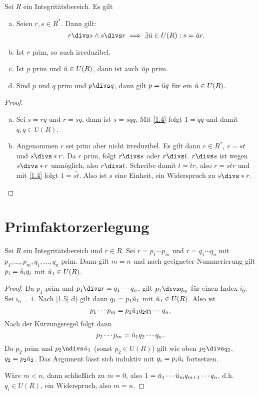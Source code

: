 \begin{lem} \label{1.5}
	Sei $R$ ein Integritätsbereich. Es gilt
	\begin{enumerate}[a)]
		\item
			Seien $r, s \in R^*$.
			Dann gilt:
			\[
				r\divs s  \land  s\divs r
				\implies
				\exists \unit u \in U(R) : s = \unit u r.
			\]
		\item
			Ist $r$ prim, so auch irreduzibel.
		\item
			Ist $p$ prim und $\breve{u} \in U(R)$, dann ist auch $\breve{u} p$ prim.
		\item
			Sind $p$ und $q$ prim und $p \divs  q$, dann gilt $p = \breve{u} q$ für ein $\breve{u} \in U(R)$.
	\end{enumerate}
	\begin{proof}
		\begin{enumerate}[a)]
			\item
				Sei $s = rq$ und $r = s\tilde q$, dann ist $s = s \tilde q q$.
				Mit \ref{1.4} folgt $1 = \tilde q q$ und damit $\tilde q, q \in U(R)$.
			\item
				Angenommen $r$ sei prim aber nicht irreduzibel.
				Es gilt dann $r \in R^*$, $r = st$ und $s \divs*  r$.
				Da $r$ prim, folgt $r \divs  s$ oder $r \divs  t$.
				$r \divs  s$ ist wegen $s \divs*  r$ unmöglich, also $r \divs  t$.
				Schreibe damit $t = \tilde t r$, also $r = s \tilde t r$ und mit \ref{1.4} folgt $1 = s \tilde t$.
				Also ist $s$ eine Einheit, ein Widerspruch zu $s \divs* r$.
		\end{enumerate}
	\end{proof}
\end{lem}

\section{Primfaktorzerlegung}

\begin{st} \label{1.6}
	Sei $R$ ein Integritätsbereich und $r \in R$.
	Sei $r = p_1 \dotsb p_m$ und $r = q_1 \dotsb q_n$ mit $p_1, \dotsc, p_m, q_1, \dotsc, q_n$ prim.
	Dann gilt $m = n$ und nach geeigneter Nummerierung gilt $p_i = \breve{u}_i q_i$ mit $\breve{u}_1 \in U(R)$.
	\begin{proof}
		Da $p_1$ prim und $p_1 \divs r = q_1 \dotsb q_n$, gilt $p_1 \divs  q_{i_0}$ für einen Index $i_0$.
		Sei \oBdA $i_0 = 1$.
		Nach \ref{1.5} d) gilt dann $q_1 = p_1 \breve{u}_1$ mit $\breve{u}_1 \in U(R)$.
		Also ist
		\[
			p_1 \dotsb p_m = p_1 \breve{u}_1 q_{2} q_3 \dotsb q_{n}.
		\]
		Nach der Kürzungsregel folgt dann
		\[
			p_2 \dotsb p_m = \breve{u}_1 q_2 \dotsb q_n.
		\]
		Da $p_2$ prim und $p_2 \ndivs \unit u_1$ (sonst $p_2 \in U(R)$) gilt wie oben \oBdA $p_2 \divs q_2$, $q_2 = p_2 \breve{u}_2$.
		Das Argument lässt sich induktiv mit $q_i = p_i \breve{u}_i$ fortsetzen.

		Wäre \oBdA $m < n$, dann schließlich zu $m = 0$, also $1 = \breve{u}_1 \dotsb \breve{u}_m q_{m+1} \dotsb q_{n}$, d.h. $q_{i} \in U(R)$, ein Widerspruch, also $m = n$.
	\end{proof}
\end{st}

